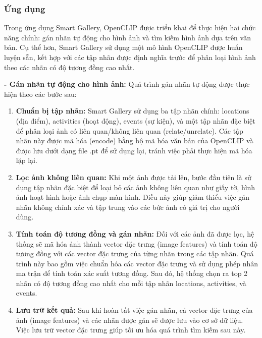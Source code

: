 \subsubsection{Ứng dụng}

Trong ứng dụng Smart Gallery, OpenCLIP được triển khai để thực hiện hai chức năng chính: gán nhãn tự động cho hình ảnh và tìm kiếm hình ảnh dựa trên văn bản. Cụ thể hơn, Smart Gallery sử dụng một mô hình OpenCLIP được huấn luyện sẵn, kết hợp với các tập nhãn được định nghĩa trước để phân loại hình ảnh theo các nhãn có độ tương đồng cao nhất.

\textbf{- Gán nhãn tự động cho hình ảnh:} Quá trình gán nhãn tự động được thực hiện theo các bước sau:

\begin{enumerate}
    \item \textbf{Chuẩn bị tập nhãn:} Smart Gallery sử dụng ba tập nhãn chính: locations (địa điểm), activities (hoạt động), events (sự kiện), và một tập nhãn đặc biệt để phân loại ảnh có liên quan/không liên quan (relate/unrelate). Các tập nhãn này được mã hóa (encode) bằng bộ mã hóa văn bản của OpenCLIP và được lưu dưới dạng file .pt để sử dụng lại, tránh việc phải thực hiện mã hóa lặp lại.
    
    \item \textbf{Lọc ảnh không liên quan:} Khi một ảnh được tải lên, bước đầu tiên là sử dụng tập nhãn đặc biệt để loại bỏ các ảnh không liên quan như giấy tờ, hình ảnh hoạt hình hoặc ảnh chụp màn hình. Điều này giúp giảm thiểu việc gán nhãn không chính xác và tập trung vào các bức ảnh có giá trị cho người dùng.
    
    \item \textbf{Tính toán độ tương đồng và gán nhãn:} Đối với các ảnh đã được lọc, hệ thống sẽ mã hóa ảnh thành vector đặc trưng (image features) và tính toán độ tương đồng với các vector đặc trưng của từng nhãn trong các tập nhãn. Quá trình này bao gồm việc chuẩn hóa các vector đặc trưng và sử dụng phép nhân ma trận để tính toán xác suất tương đồng. Sau đó, hệ thống chọn ra top 2 nhãn có độ tương đồng cao nhất cho mỗi tập nhãn locations, activities, và events.
    
    \item \textbf{Lưu trữ kết quả:} Sau khi hoàn tất việc gán nhãn, cả vector đặc trưng của ảnh (image features) và các nhãn được gán sẽ được lưu vào cơ sở dữ liệu. Việc lưu trữ vector đặc trưng giúp tối ưu hóa quá trình tìm kiếm sau này.
\end{enumerate}

